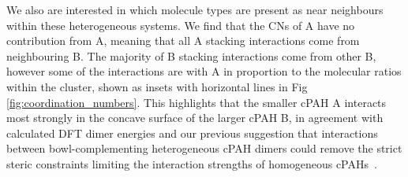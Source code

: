 We also are interested in which molecule types are present as near neighbours within these heterogeneous systems. We find that the CNs of A have no contribution from A, meaning that all A stacking interactions come from neighbouring B. The majority of B stacking interactions come from other B, however some of the interactions are with A in proportion to the molecular ratios within the cluster, shown as insets with horizontal lines in Fig \ref{fig:coordination_numbers}. This highlights that the smaller cPAH A interacts most strongly in the concave surface of the larger cPAH B, in agreement with calculated DFT dimer energies and our previous suggestion that interactions between bowl-complementing heterogeneous cPAH dimers could remove the strict steric constraints limiting the interaction strengths of homogeneous cPAHs~\cite{Martin2018polar}. 

